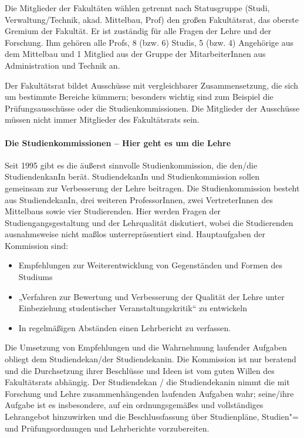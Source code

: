 Die Mitglieder der Fakultäten wählen getrennt nach Statusgruppe (Studi, Verwaltung/Technik, akad. Mittelbau, Prof) den großen Fakultätsrat, das oberste Gremium der Fakultät. Er ist zuständig für alle Fragen der Lehre und der Forschung. Ihm gehören alle Profs, 8 (bzw. 6) Studis, 5 (bzw. 4) Angehörige aus dem Mittelbau und 1 Mitglied aus der Gruppe der MitarbeiterInnen aus Administration und Technik an.

Der Fakultätsrat bildet Ausschüsse mit vergleichbarer Zusammensetzung, die sich um bestimmte Bereiche kümmern; besonders wichtig
sind zum Beispiel die Prüfungsausschüsse oder die Studienkommissionen. Die Mitglieder der Ausschüsse müssen nicht immer Mitglieder des Fakultätsrats
sein.


\paragraph{Die Studienkommissionen -- Hier geht es um die Lehre}

Seit 1995 gibt es die äußerst sinnvolle Studienkommission, die den/die StudiendenkanIn berät. StudiendekanIn und Studienkommission sollen gemeinsam zur Verbesserung der Lehre beitragen. Die Studienkommission besteht aus StudiendekanIn, drei weiteren ProfessorInnen, zwei VertreterInnen des Mittelbaus sowie vier Studierenden. Hier werden Fragen der Studiengangsgestaltung und der Lehrqualität diskutiert, wobei die Studierenden ausnahmsweise nicht maßlos unterrepräsentiert sind. Hauptaufgaben der Kommission sind:
\begin{itemize}
    \addtolength{\itemsep}{-0.7\baselineskip}
    \item Empfehlungen zur Weiterentwicklung von Gegenständen und Formen des Studiums
    \item „Verfahren zur Bewertung und Verbesserung  der Qualität der Lehre unter
          Einbeziehung studentischer Veranstaltungskritik“ zu entwickeln
    \item In regelmäßigen Abständen einen Lehrbericht zu verfassen.
\end{itemize}

Die Umsetzung von Empfehlungen und die Wahrnehmung laufender Aufgaben
obliegt dem Studiendekan/der Studiendekanin. Die Kommission ist nur
beratend und die Durchsetzung ihrer Beschlüsse und Ideen ist vom guten
Willen des Fakultätsrats abhängig. Der Studiendekan / die Studiendekanin
nimmt die mit Forschung und Lehre zusammenhängenden laufenden Aufgaben
wahr; seine/ihre Aufgabe ist es insbesondere, auf ein ordnungsgemäßes und
vollständiges Lehrangebot hinzuwirken und die Beschlussfassung über
Studienpläne, Studien"= und Prüfungsordnungen und Lehrberichte
vorzubereiten.


